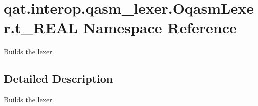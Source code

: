 \hypertarget{namespaceqat_1_1interop_1_1qasm__lexer_1_1OqasmLexer_1_1t__REAL}{\section{qat.\-interop.\-qasm\-\_\-lexer.\-Oqasm\-Lexer.\-t\-\_\-\-R\-E\-A\-L Namespace Reference}
\label{namespaceqat_1_1interop_1_1qasm__lexer_1_1OqasmLexer_1_1t__REAL}
}


Builds the lexer.  




\subsection{Detailed Description}
Builds the lexer. 